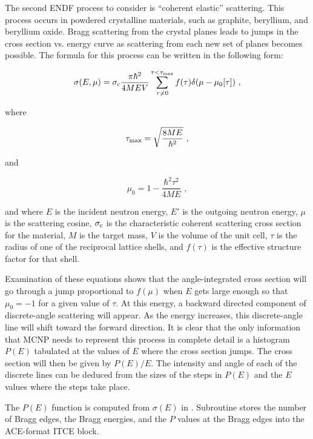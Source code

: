 The second ENDF process to consider is ``coherent elastic'' scattering.
 This process occurs in powdered crystalline
materials, such as graphite, beryllium, and beryllium oxide.  Bragg
scattering from the crystal planes leads to jumps in the cross
section vs. energy curve as scattering from each
new set of planes becomes possible.  The formula for this process can
be written in the following form:

\begin{equation}
   \sigma(E,\mu)=\sigma_{\rm c}
    \frac{\pi\hbar^2}{4MEV}
     \sum_{\tau\ne 0}^{\tau<\tau_{\rm max}}
      f(\tau)\delta(\mu-\mu_0[\tau])\,\,,
\end{equation}

\noindent
where

\begin{equation}
   \tau_{\rm max}=\sqrt{\frac{8ME}{\hbar^2}}\,\,,
\end{equation}

\noindent
and

\begin{equation}
   \mu_0=1-\frac{\hbar^2\tau^2}{4ME}\,\,,
\end{equation}

\noindent
and where $E$ is the incident neutron energy, $E'$ is the outgoing
neutron energy, $\mu$ is the scattering cosine, $\sigma_{\rm c}$ is
the characteristic coherent scattering cross section
 for the material, $M$ is the target
mass, $V$ is the volume of the unit cell, $\tau$ is the radius
of one of the reciprocal lattice shells, and $f(\tau)$ is the
effective structure factor for that shell.

Examination of these equations shows that the angle-integrated
cross section will go through a jump proportional to $f(\mu)$ when
$E$ gets large enough so that $\mu_0=-1$ for a given value of $\tau$.
At this energy, a backward directed component of discrete-angle
scattering will appear.  As the energy increases, this discrete-angle
line will shift toward the forward direction.  It is clear that the
only information that MCNP needs to represent this process in
complete detail is a histogram $P(E)$ tabulated at the values of $E$
where the cross section jumps.  The cross section will then be given
by $P(E)/E$.  The intensity and angle of each of the discrete lines
can be deduced from the sizes of the steps in $P(E)$ and the $E$
values where the steps take place.

The $P(E)$ function is computed from $\sigma(E)$ in .
Subroutine  stores the number of Bragg edges, the Bragg
energies, and the $P$ values at the Bragg edges into the ACE-format
ITCE block.

